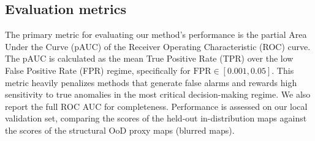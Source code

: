 \documentclass[]{article}
\begin{document}
\subsection{Evaluation metrics}
The primary metric for evaluating our method's performance is the partial Area Under the Curve (pAUC) of the Receiver Operating Characteristic (ROC) curve. The pAUC is calculated as the mean True Positive Rate (TPR) over the low False Positive Rate (FPR) regime, specifically for $\text{FPR} \in [0.001, 0.05]$. This metric heavily penalizes methods that generate false alarms and rewards high sensitivity to true anomalies in the most critical decision-making regime. We also report the full ROC AUC for completeness. Performance is assessed on our local validation set, comparing the scores of the held-out in-distribution maps against the scores of the structural OoD proxy maps (blurred maps).
\end{document}
